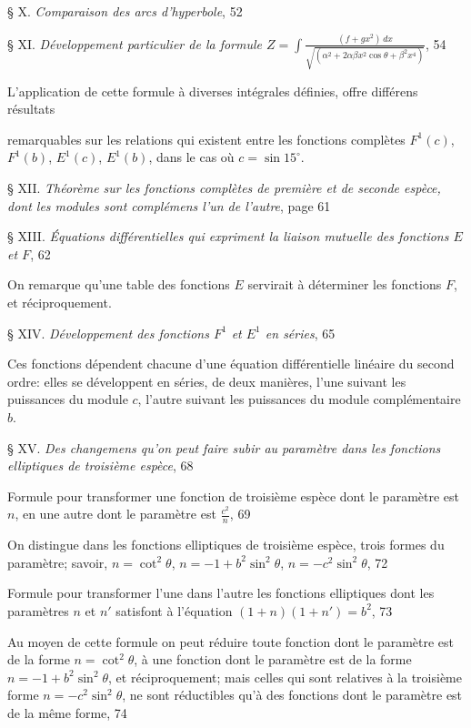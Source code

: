 \documentclass{article}
\begin{document}
§ X. \emph{Comparaison des arcs d'hyperbole}, 52

§ XI. \emph{Développement particulier de la formule $\displaystyle Z=\int\frac{(f+gx^{2})\,dx}{\sqrt{(\alpha^{2}+2\alpha\beta x^{2}\cos\theta+\beta^{2}x^{4})}}$}, 54

L'application de cette formule à diverses intégrales définies, offre différens résultats

remarquables sur les relations qui existent entre les fonctions complètes $F^{1}(c)$, $F^{1}(b)$, $E^{1}(c)$, $E^{1}(b)$, dans le cas où $c=\sin15^{\circ}$.

§ XII. \emph{Théorème sur les fonctions complètes de première et de seconde espèce, dont les modules sont complémens l'un de l'autre}, page 61

§ XIII. \emph{Équations différentielles qui expriment la liaison mutuelle des fonctions $E$ et $F$}, 62

On remarque qu'une table des fonctions $E$ servirait à déterminer les fonctions $F$, et réciproquement.

§ XIV. \emph{Développement des fonctions $F^{1}$ et $E^{1}$ en séries}, 65

Ces fonctions dépendent chacune d'une équation différentielle linéaire du second ordre: elles se développent en séries, de deux manières, l'une suivant les puissances du module $c$, l'autre suivant les puissances du module complémentaire $b$.

§ XV. \emph{Des changemens qu'on peut faire subir au paramètre dans les fonctions elliptiques de troisième espèce}, 68

Formule pour transformer une fonction de troisième espèce dont le paramètre est $n$, en une autre dont le paramètre est $\frac{c^{2}}{n}$, 69

On distingue dans les fonctions elliptiques de troisième espèce, trois formes du paramètre; savoir, $n=\cot^{2}\theta$, $n=-1+b^{2}\sin^{2}\theta$, $n=-c^{2}\sin^{2}\theta$, 72

Formule pour transformer l'une dans l'autre les fonctions elliptiques dont les paramètres $n$ et $n'$ satisfont à l'équation $(1+n)(1+n')=b^{2}$, 73

Au moyen de cette formule on peut réduire toute fonction dont le paramètre est de la forme $n=\cot^{2}\theta$, à une fonction dont le paramètre est de la forme $n=-1+b^{2}\sin^{2}\theta$, et réciproquement; mais celles qui sont relatives à la troisième forme $n=-c^{2}\sin^{2}\theta$, ne sont réductibles qu'à des fonctions dont le paramètre est de la même forme, 74
\end{document}
